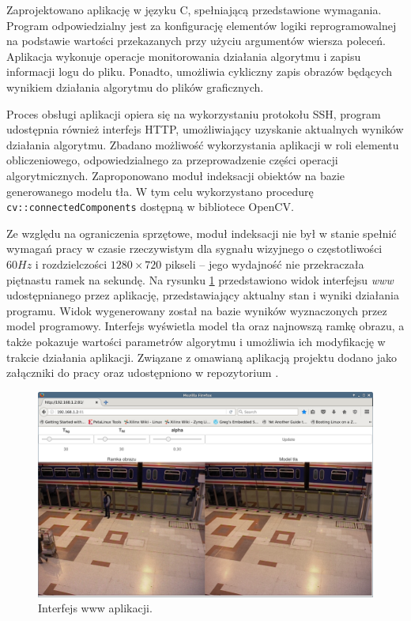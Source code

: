 Zaprojektowano aplikację w języku C, spełniającą przedstawione wymagania.
Program odpowiedzialny jest za konfigurację elementów logiki reprogramowalnej na podstawie wartości przekazanych przy użyciu argumentów wiersza poleceń. 
Aplikacja wykonuje operacje monitorowania działania algorytmu i zapisu informacji logu do pliku. 
Ponadto, umożliwia cykliczny zapis obrazów będących wynikiem działania algorytmu do plików graficznych. 

Proces obsługi aplikacji opiera się na wykorzystaniu protokołu SSH, program udostępnia również interfejs HTTP, umożliwiający uzyskanie aktualnych wyników działania algorytmu.
Zbadano możliwość wykorzystania aplikacji w roli elementu obliczeniowego, odpowiedzialnego za przeprowadzenie części operacji algorytmicznych. 
Zaproponowano moduł indeksacji obiektów na bazie generowanego modelu tła. 
W tym celu wykorzystano procedurę \texttt{cv::connectedComponents} dostępną w bibliotece OpenCV. 

Ze względu na ograniczenia sprzętowe, moduł indeksacji nie był w stanie spełnić wymagań pracy w czasie rzeczywistym dla sygnału wizyjnego o częstotliwości $60Hz$ i rozdzielczości $1280 \times 720 $ pikseli -- jego wydajność nie przekraczała piętnastu ramek na sekundę.
Na rysunku \ref{fig:background-buffer-www} przedstawiono widok interfejsu \emph{www} udostępnianego przez aplikację, przedstawiający aktualny stan i wyniki działania programu. Widok wygenerowany został na bazie wyników wyznaczonych przez model programowy. Interfejs wyświetla model tła oraz najnowszą ramkę obrazu, a także pokazuje wartości parametrów algorytmu i umożliwia ich modyfikację w trakcie działania aplikacji.
Związane z omawianą aplikacją projektu dodano jako załączniki do pracy oraz udostępniono w repozytorium \cite{git-repository}.
\begin{figure}[!htb]
	\centering
	\includegraphics[width=12cm]{img/www-iface.png}
	\caption{Interfejs www aplikacji.}
	\label{fig:background-buffer-www}
\end{figure}

